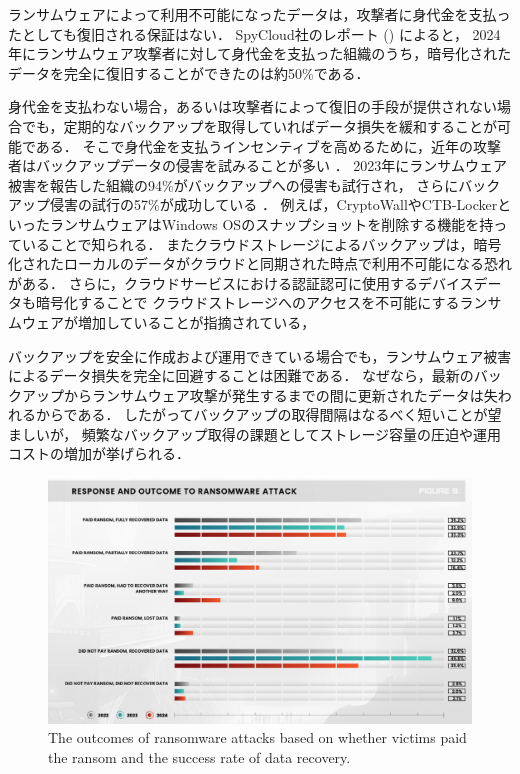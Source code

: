 ランサムウェアによって利用不可能になったデータは，攻撃者に身代金を支払ったとしても復旧される保証はない．
SpyCloud社のレポート \cite{spycloud-ransomware} () によると，
2024年にランサムウェア攻撃者に対して身代金を支払った組織のうち，暗号化されたデータを完全に復旧することができたのは約50\%である．

身代金を支払わない場合，あるいは攻撃者によって復旧の手段が提供されない場合でも，定期的なバックアップを取得していればデータ損失を緩和することが可能である．
そこで身代金を支払うインセンティブを高めるために，近年の攻撃者はバックアップデータの侵害を試みることが多い \cite{spycloud-ransomware}．
2023年にランサムウェア被害を報告した組織の94\%がバックアップへの侵害も試行され，
さらにバックアップ侵害の試行の57\%が成功している \cite{sophos-report:online}．
例えば，CryptoWallやCTB-LockerといったランサムウェアはWindows OSのスナップショットを削除する機能を持っている\cite{remove-shadow-copy}ことで知られる．
またクラウドストレージによるバックアップは，暗号化されたローカルのデータがクラウドと同期された時点で利用不可能になる恐れがある．
さらに，クラウドサービスにおける認証認可に使用するデバイスデータも暗号化することで
クラウドストレージへのアクセスを不可能にするランサムウェアが増加していることが指摘されている\cite{matos2018rockfs}，

バックアップを安全に作成および運用できている場合でも，ランサムウェア被害によるデータ損失を完全に回避することは困難である．
なぜなら，最新のバックアップからランサムウェア攻撃が発生するまでの間に更新されたデータは失われるからである．
したがってバックアップの取得間隔はなるべく短いことが望ましいが，
頻繁なバックアップ取得の課題としてストレージ容量の圧迫や運用コストの増加が挙げられる\cite{wang2024ransom}．
\begin{figure}[t]
  \begin{center}
    \includegraphics[width=\columnwidth]{doc/img/pay-ransom-back-data.eps}
  \end{center}
  \caption{
    The outcomes of ransomware attacks based on whether victims paid the ransom and the success rate of data recovery.
    \cite{spycloud-ransomware}}
  \label{fig:pay-ransom-back-data}
\end{figure}


